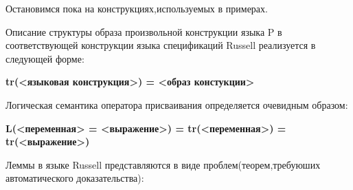 \documentclass[10pt,a4paper]{article}
\begin{document}
Остановимся пока на конструкциях,используемых в примерах.

Описание структуры образа произвольной конструкции языка P в соответствующей конструкции языка спецификаций Russell реализуется в следующей форме:
\begin{flushleft}
\textbf{tr(<языковая конструкция>)  =  <образ констукции>}
\end{flushleft}

Логическая семантика оператора присваивания определяется очевидным образом:

\begin{flushleft}
\textbf{L(<переменная> = <выражение>)  =  tr(<переменная>) = tr(<выражение>)}
\end{flushleft}

Леммы в языке Russell представляются в виде проблем(теорем,требуюших автоматического доказательства):
\end{document}
